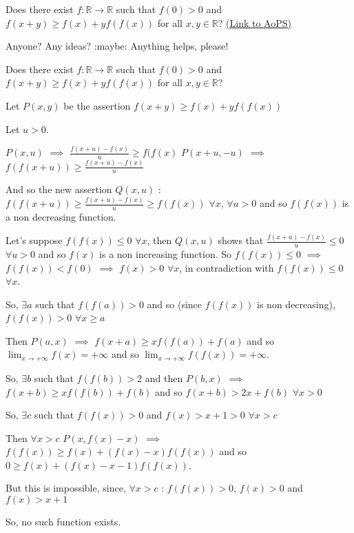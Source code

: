 \begin{problem}
	Does there exist $ f: \mathbb{R} \rightarrow \mathbb{R}$ such that $ f(0)>0$ and $ f(x+y) \geq f(x)+yf(f(x))$ for all $ x,y \in \mathbb{R}$?
	\flushright \href{https://artofproblemsolving.com/community/c6h271856}{(Link to AoPS)}
\end{problem}



\begin{solution}
	Anyone? Any ideas? :maybe:  Anything helps, please!
\end{solution}



\begin{solution}
	\begin{tcolorbox}Does there exist $ f: \mathbb{R} \rightarrow \mathbb{R}$ such that $ f(0) > 0$ and $ f(x + y) \geq f(x) + yf(f(x))$ for all $ x,y \in \mathbb{R}$?\end{tcolorbox}

Let $ P(x,y)$ be the assertion $ f(x + y)\geq f(x) + yf(f(x))$

Let $ u > 0$.

$ P(x,u)$ $ \implies$ $ \frac {f(x + u) - f(x)}{u}\geq f(f(x)$
$ P(x + u, - u)$ $ \implies$ $ f(f(x + u)) \geq\frac {f(x + u) - f(x)}{u}$

And so the new assertion $ Q(x,u)$ : $ f(f(x + u)) \geq\frac {f(x + u) - f(x)}{u}\geq f(f(x))$ $ \forall x$, $ \forall u > 0$ and so $ f(f(x))$ is a non decreasing function.

Let's suppose $ f(f(x))\leq 0$ $ \forall x$, then $ Q(x,u)$ shows that $ \frac {f(x + u) - f(x)}{u}\leq 0$ $ \forall u > 0$ and so $ f(x)$ is a non increasing function. So $ f(f(x))\leq 0$ $ \implies$ $ f(f(x)) < f(0)$ $ \implies$ $ f(x) > 0$ $ \forall x$, in contradiction with $ f(f(x))\leq 0$ $ \forall x$.

So, $ \exists a$ such that $ f(f(a)) > 0$ and so (since $ f(f(x))$ is non decreasing), $ f(f(x)) > 0$ $ \forall x\geq a$

Then $ P(a,x)$ $ \implies$ $ f(x + a)\geq xf(f(a)) + f(a)$ and so $ \lim_{x\to + \infty}f(x) = + \infty$ and so $ \lim_{x\to + \infty}f(f(x)) = + \infty$.

So, $ \exists b$ such that $ f(f(b)) > 2$ and then $ P(b,x)$ $ \implies$ $ f(x + b)\geq xf(f(b)) + f(b)$ and so $ f(x + b) > 2x + f(b)$ $ \forall x > 0$

So, $ \exists c$ such that $ f(f(x)) > 0$ and $ f(x) > x + 1 > 0$ $ \forall x > c$

Then $ \forall x > c$ $ P(x,f(x) - x)$ $ \implies$ $ f(f(x))\geq f(x) + (f(x) - x)f(f(x))$ and so $ 0\geq f(x) + (f(x) - x - 1)f(f(x))$.

But this is impossible, since, $ \forall x > c$ :  $ f(f(x)) > 0$, $ f(x) > 0$ and $ f(x) > x + 1$

So, no such function exists.
\end{solution}
